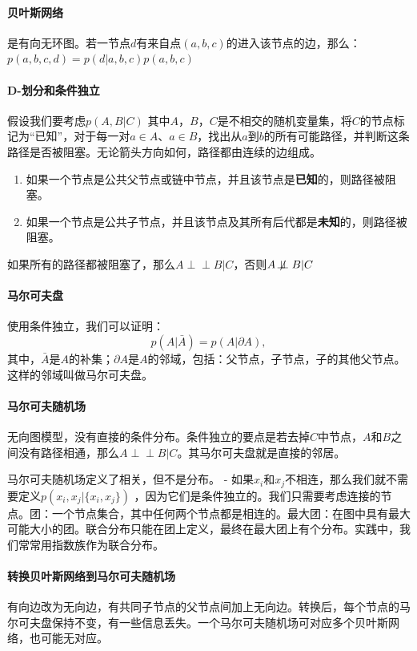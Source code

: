 \paragraph{贝叶斯网络} 是有向无环图。若一节点$d$有来自点$(a,b,c)$的进入该节点的边，那么：
$p(a,b,c,d) = p(d|a,b,c)p(a,b,c)$

\paragraph{D-划分和条件独立}
假设我们要考虑$p(A,B|C)$ 其中$A$，$B$，$C$是不相交的随机变量集，将$C$的节点标记为“已知”，对于每一对$a \in A$、$a \in B$，找出从$a$到$b$的所有可能路径，并判断这条路径是否被阻塞。无论箭头方向如何，路径都由连续的边组成。
\begin{enumerate}
\item 如果一个节点是公共父节点或链中节点，并且该节点是\textbf{已知}的，则路径被阻塞。
\item 如果一个节点是公共子节点，并且该节点及其所有后代都是\textbf{未知}的，则路径被阻塞。
\end{enumerate}
如果所有的路径都被阻塞了，那么$A \perp \!\!\! \perp B | C$，否则$A \not \! \perp \!\!\! \perp B | C$

\paragraph{马尔可夫盘}
使用条件独立，我们可以证明：$$p(A|\bar{A}) = p(A|\partial A),$$其中，$\bar{A}$是$A$的补集；$\partial A$是$A$的邻域，包括：父节点，子节点，子的其他父节点。这样的邻域叫做马尔可夫盘。

\paragraph{马尔可夫随机场} 无向图模型，没有直接的条件分布。条件独立的要点是若去掉$C$中节点，$A$和$B$之间没有路径相通，那么$A \perp \!\!\! \perp B | C$。其马尔可夫盘就是直接的邻居。

马尔可夫随机场定义了相关，但不是分布。
- 如果$x_i$和$x_j$不相连，那么我们就不需要定义$p(x_i, x_j |\{x_i , x_j\})$ ，因为它们是条件独立的。我们只需要考虑连接的节点。团：一个节点集合，其中任何两个节点都是相连的。最大团：在图中具有最大可能大小的团。联合分布只能在团上定义，最终在最大团上有个分布。实践中，我们常常用指数族作为联合分布。

\paragraph{转换贝叶斯网络到马尔可夫随机场}
有向边改为无向边，有共同子节点的父节点间加上无向边。转换后，每个节点的马尔可夫盘保持不变，有一些信息丢失。一个马尔可夫随机场可对应多个贝叶斯网络，也可能无对应。

